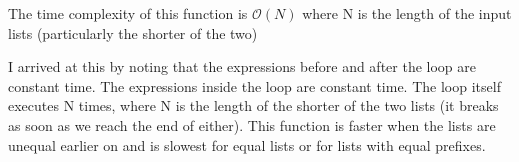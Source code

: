 \documentclass{article}
\begin{document}
\begin{enumerate}
\begin{enumerate}
  The time complexity of this function is $\mathcal{O}(N)$ where N is the
  length of the input lists (particularly the shorter of the two)

  I arrived at this by noting that the expressions before and after the loop
  are constant time. The expressions inside the loop are constant time. The
  loop itself executes N times, where N is the length of the shorter of the two
  lists (it breaks as soon as we reach the end of either). This function is
  faster when the lists are unequal earlier on and is slowest for equal lists
  or for lists with equal prefixes.

\end{enumerate}


\end{enumerate}
\end{document}
